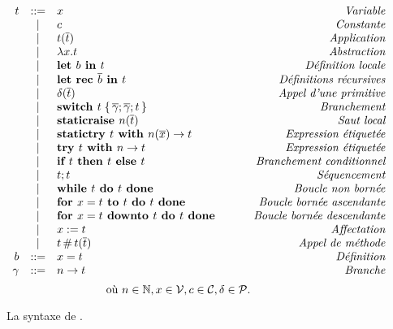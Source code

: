 \begin{figure}

\[
\begin{array}{rclr}
t
  & ::= & x & \qquad\textit{Variable} \\
  & |   & c & \qquad\textit{Constante} \\
  & |   & t (\overline{t}) & \qquad\textit{Application} \\
  & |   & \lambda x. t & \qquad\textit{Abstraction} \\
  & |   & \textbf{let }b \textbf{ in } t & \qquad\textit{Définition locale} \\
  & |   & \textbf{let rec }\overline{b} \textbf{ in } t & \qquad\textit{Définitions récursives} \\
  & |   & \delta (\overline{t}) & \qquad\textit{Appel d'une primitive} \\
  & |   & \textbf{switch } t \;\{\, \overline{\gamma}; \overline{\gamma}; t \,\}
        & \qquad\textit{Branchement} \\
  & |   & \textbf{staticraise } n (\overline{t}) & \qquad\textit{Saut local} \\
  & |   & \textbf{statictry } t \textbf{ with } n (\overline{x}) \rightarrow t & \qquad\textit{Expression étiquetée} \\
  & |   & \textbf{try } t \textbf{ with } n \rightarrow t & \qquad\textit{Expression étiquetée} \\
  & |   & \textbf{if } t \textbf{ then } t \textbf{ else } t & \qquad\textit{Branchement conditionnel} \\
  & |   & t ; t & \qquad\textit{Séquencement} \\
  & |   & \textbf{while } t \textbf{ do } t \textbf{ done } & \qquad\textit{Boucle non bornée} \\
  & |   & \textbf{for } x = t \textbf{ to } t \textbf{ do } t \textbf{ done } & \qquad\textit{Boucle bornée ascendante} \\
  & |   & \textbf{for } x = t \textbf{ downto } t \textbf{ do } t \textbf{ done } & \qquad\textit{Boucle bornée descendante} \\
  & |   & x := t & \qquad\textit{Affectation} \\
  & |   & t \,\#\, t (\overline{t}) & \qquad\textit{Appel de méthode} \\
b & ::= & x = t & \qquad\textit{Définition} \\
\gamma  & ::= & n \rightarrow t & \qquad\textit{Branche} \\
\end{array}
\]
\[
\textrm{où }
n \in \mathbb{N},
x \in \mathcal{V},
c \in \mathcal{C},
\delta \in \mathcal{P}.
\]

\caption{La syntaxe de {\LambdaCode}.}
\label{fig:lambda-syntax}
\end{figure}
